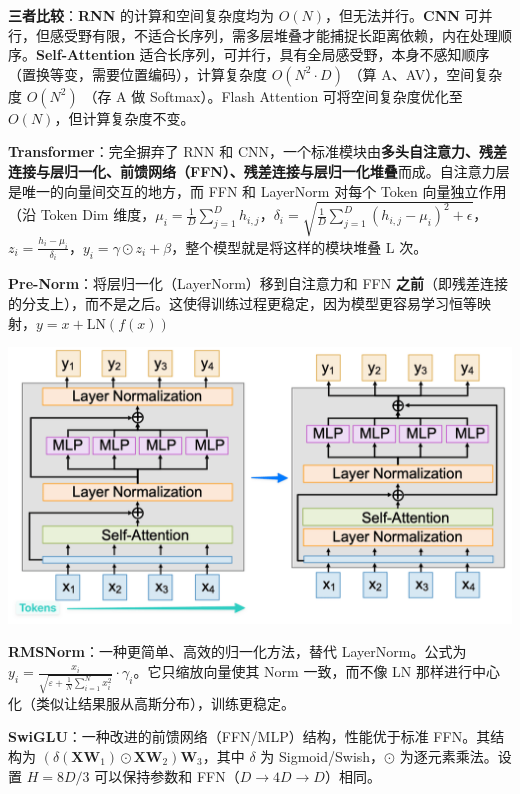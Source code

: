 \documentclass[
  8pt]{extarticle}
\begin{document}
\begin{multicols*}{4}
\textbf{三者比较}：\textbf{RNN} 的计算和空间复杂度均为
\(O(N)\)，但无法并行。\textbf{CNN}
可并行，但感受野有限，不适合长序列，需多层堆叠才能捕捉长距离依赖，内在处理顺序。\textbf{Self-Attention}
适合长序列，可并行，具有全局感受野，本身不感知顺序（置换等变，需要位置编码），计算复杂度
\(O(N^2 \cdot D)\) （算 A、AV），空间复杂度 \(O(N^2)\) （存 A 做
Softmax）。Flash Attention 可将空间复杂度优化至
\(O(N)\)，但计算复杂度不变。

\textbf{Transformer}：完全摒弃了 RNN 和
CNN，一个标准模块由\textbf{多头自注意力、残差连接与层归一化、前馈网络（FFN）、残差连接与层归一化堆叠}而成。自注意力层是唯一的向量间交互的地方，而
FFN 和 LayerNorm 对每个 Token 向量独立作用（沿 Token Dim
维度，\(\mu_i = \frac{1}{D} \sum_{j=1}^{D} h_{i,j}\)，\(\delta_i = \sqrt{\frac{1}{D} \sum_{j=1}^{D} (h_{i,j} - \mu_i)^2 + \epsilon}\)，\(z_i = \frac{h_i - \mu_i}{\delta_i}\)，\(y_i = \gamma \odot z_i + \beta\)，整个模型就是将这样的模块堆叠
L 次。

\textbf{Pre-Norm}：将层归一化（LayerNorm）移到自注意力和 FFN
\textbf{之前}（即残差连接的分支上），而不是之后。这使得训练过程更稳定，因为模型更容易学习恒等映射，\(y = x + \text{LN}(f(x))\)

\includegraphics{./Cheatsheet-02-Self-Attention-and-Transformer.assets/image-20250618013153677.png}

\textbf{RMSNorm}：一种更简单、高效的归一化方法，替代 LayerNorm。公式为
\(y_i = \frac{x_i}{\sqrt{\varepsilon + \frac{1}{N} \sum_{i=1}^{N} x_i^2}} \cdot \gamma_i\)。它只缩放向量使其
Norm 一致，而不像 LN
那样进行中心化（类似让结果服从高斯分布），训练更稳定。

\textbf{SwiGLU}：一种改进的前馈网络（FFN/MLP）结构，性能优于标准
FFN。其结构为
\((\delta(\mathbf{X}\mathbf{W}_1) \odot \mathbf{X}\mathbf{W}_2)\mathbf{W}_3\)，其中
\(\delta\) 为 Sigmoid/Swish，\(\odot\) 为逐元素乘法。设置 \(H = 8D/3\)
可以保持参数和 FFN（\(D \to 4D \to D\)）相同。


\end{multicols*}
\end{document}
